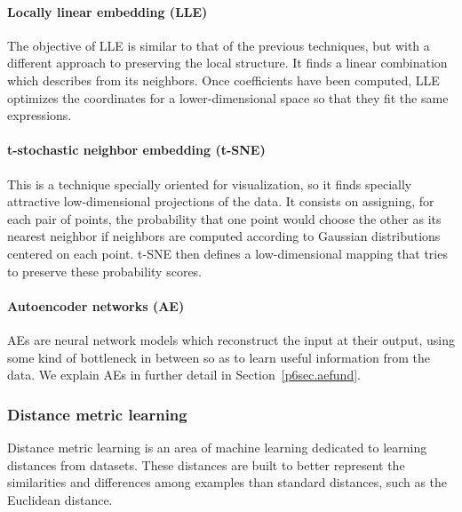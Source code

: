 \paragraph*{Locally linear embedding (LLE) \cite{LLE}} The objective of LLE is similar to that of the previous techniques, but with a different approach to preserving the local structure. It finds a linear combination which describes  from its neighbors. Once  coefficients have been computed, LLE optimizes the coordinates for a lower-dimensional space so that they fit the same expressions.

\paragraph*{t-stochastic neighbor embedding (t-SNE) \cite{van2008visualizing}} This is a technique specially oriented for visualization, so it finds specially attractive low-dimensional projections of the data. %
It consists on assigning, for each pair of points, the probability that one point would choose the other as its nearest neighbor if neighbors are computed according to Gaussian distributions centered on each point. t-SNE then defines a low-dimensional mapping that tries to preserve these probability scores.

\paragraph*{Autoencoder networks (AE) \cite{charte-tutorial}} AEs are neural network models which reconstruct the input at their output, using some kind of bottleneck in between so as to learn useful information from the data. We explain AEs in further detail in Section~\ref{p6sec.aefund}.


\subsubsection{Distance metric learning}

Distance metric learning \cite{suarez2018tutorial} is an area of machine learning dedicated to learning distances from datasets. These distances are built to better represent the similarities and differences among examples than standard distances, such as the Euclidean distance.

